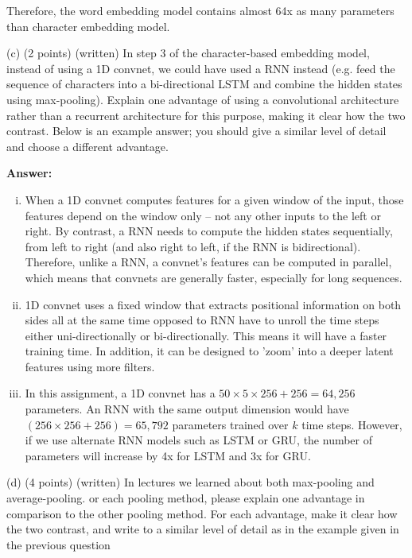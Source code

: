 \documentclass{article}
\begin{document}
\noindent 
Therefore, the word embedding model contains almost 64x as many parameters than character embedding model.

\bigbreak
\noindent
(c) (2 points) (written) In step 3 of the character-based embedding model, instead of using a 1D convnet, we could have used a RNN instead (e.g. feed the sequence of characters into a bi-directional LSTM and combine the hidden states using max-pooling). Explain one advantage of using a convolutional architecture rather than a recurrent architecture for this purpose, making it clear how the two contrast. Below is an example answer; you should give a similar level of detail and choose a different advantage.

\bigbreak
\noindent
\textbf{Answer:}
\begin{enumerate}[i)]
\item When a 1D convnet computes features for a given window of the input, those features depend on the window only – not any other inputs to the left or right. By contrast, a RNN needs to compute the hidden states sequentially, from left to right (and also right to left, if the RNN is bidirectional). Therefore, unlike a RNN, a convnet’s features can be computed in parallel, which means that convnets are generally faster, especially for long sequences.
\item 1D convnet uses a fixed window that extracts positional information on both sides all at the same time opposed to RNN have to unroll the time steps either uni-directionally or bi-directionally. This means it will have a faster training time. In addition, it can be designed to 'zoom' into a deeper latent features using more filters.
\item In this assignment, a 1D convnet has a $50 \times 5 \times 256 + 256 = 64,256$ parameters. An RNN with the same output dimension would have $(256\times256 + 256) = 65,792$ parameters trained over $k$ time steps. However, if we use alternate RNN models such as LSTM or GRU, the number of parameters will increase by 4x for LSTM and 3x for GRU.
\end{enumerate}

\bigbreak
\noindent
(d) (4 points) (written) In lectures we learned about both max-pooling and average-pooling. or each pooling method, please explain one advantage in  comparison to the other pooling method.  For each advantage, make it clear how the two contrast, and write to a similar level of detail as in the example given in the previous question
\end{document}
